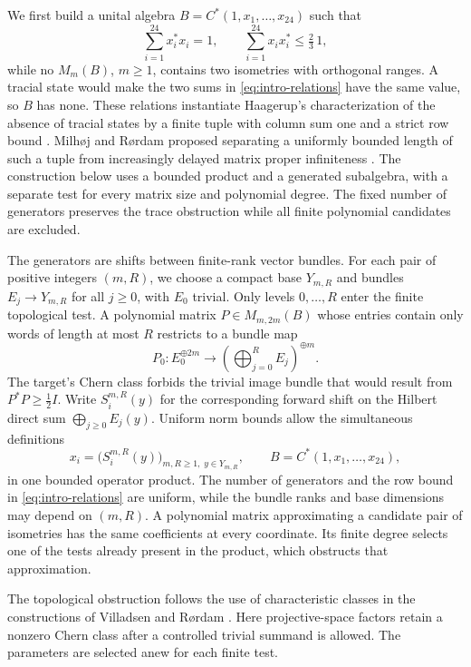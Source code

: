 We first build a unital algebra \(B=C^*(1,x_1,\ldots,x_{24})\) such that
\begin{equation}
 \sum_{i=1}^{24}x_i^*x_i=1,\qquad
 \sum_{i=1}^{24}x_ix_i^*\le\tfrac23\,1,
 \label{eq:intro-relations}
\end{equation}
while no \(M_m(B)\), \(m\ge1\), contains two isometries with orthogonal
ranges. A tracial state would make the two sums in
\eqref{eq:intro-relations} have the same value, so \(B\) has none.
These relations instantiate Haagerup's characterization of the absence
of tracial states by a finite tuple with column sum one and a strict
row bound \cite[Lemma~2.1]{Haagerup}.
Milh{\o}j and R{\o}rdam proposed separating a uniformly bounded length
of such a tuple from increasingly delayed matrix proper infiniteness
\cite[Remark~4.7]{MR}. The construction below uses a bounded product
and a generated subalgebra, with a separate test for every matrix size
and polynomial degree. The fixed number of generators preserves the
trace obstruction while all finite polynomial candidates are excluded.

The generators are shifts between finite-rank vector bundles. For
each pair of positive integers \((m,R)\), we choose a compact base
\(Y_{m,R}\) and bundles \(E_j\to Y_{m,R}\) for all \(j\geq0\), with
\(E_0\) trivial. Only levels \(0,\ldots,R\) enter the finite topological
test. A polynomial matrix \(P\in M_{m,2m}(B)\) whose entries contain
only words of length at most \(R\) restricts to a bundle map
\[
 P_0:E_0^{\oplus2m}\longrightarrow
 \left(\bigoplus_{j=0}^{R}E_j\right)^{\oplus m}.
\]
The target's Chern class forbids the trivial image bundle that would
result from \(P^*P\geq\tfrac12 I\). Write \(S_i^{m,R}(y)\) for the
corresponding forward shift on the Hilbert direct sum
\(\bigoplus_{j\geq0}E_j(y)\). Uniform norm bounds allow the simultaneous definitions
\[
 x_i=\bigl(S_i^{m,R}(y)\bigr)_{m,R\geq1,\;y\in Y_{m,R}},
 \qquad B=C^*(1,x_1,\ldots,x_{24}),
\]
in one bounded operator product. The number of generators and the row
bound in \eqref{eq:intro-relations} are uniform, while the bundle ranks
and base dimensions may depend on \((m,R)\). A polynomial matrix
approximating a candidate pair of isometries has the same coefficients
at every coordinate. Its finite degree selects one of the tests already
present in the product, which obstructs that approximation.

The topological obstruction follows the use of characteristic classes
in the constructions of Villadsen \cite[Section~3]{Villadsen1999}
and R{\o}rdam \cite[Proposition~4.5]{Rordam2003}.
Here projective-space factors retain a nonzero Chern class after a
controlled trivial summand is allowed. The parameters are selected
anew for each finite test.


